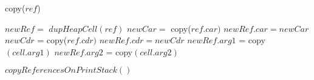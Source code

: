 \documentclass[9pt]{article}
\begin{document}
\begin{function*}
\SetStartEndCondition{ }{}{}%
%
%
%
\newcommand{\forcond}{$i$ \KwTo\Range{$n$}}
\AlgoDontDisplayBlockMarkers\SetAlgoNoEnd\SetAlgoNoLine%
%
%
\Fn{\Lgc{}}
 {
   {
    {copy($\mathit{ref}$)}
   }
}

{
     $\mathit{newRef} = $  $dupHeapCell(\mathit{ref})$\;
        {
               {
                 $\mathit{newCar}  = $  copy($\mathit{ref.car})$\;
                 $\mathit{newRef}.car   =  newCar$\;
               }
               {
                 $\mathit{newCdr}$ =   copy($\mathit{ref.cdr})$\;
                 $\mathit{newRef.cdr}   = \mathit{newCdr}$\;
               }    
        }
          {
             $\mathit{newRef.arg1}$ =  copy$\mathit{(cell.arg1)}$\;
             $\mathit{newRef.arg2}$ =  copy$\mathit{(cell.arg2)}$\;
          }
   
 $\mathit{copyReferencesOnPrintStack()}$\;
}
\end{function*}
\end{document}
